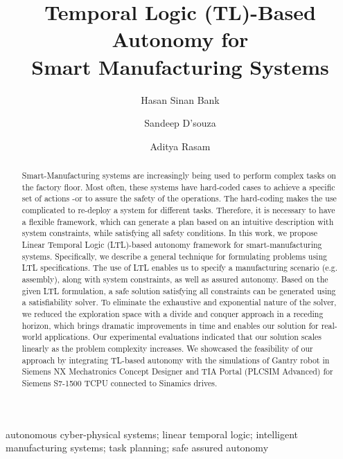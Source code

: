 \documentclass[3p,twocolumn,times,procedia]{elsarticle}
\begin{document}
\begin{frontmatter}


\title{Temporal Logic (TL)-Based Autonomy for\\ Smart Manufacturing Systems}

\author[a]{Hasan Sinan Bank}
\author[b]{Sandeep D'souza}
\author[c]{Aditya Rasam}

\address[a]{Siemens Corporation, Corporate Technology, Princeton, USA} %
\address[b]{Carnegie Mellon University, Pittsburgh, USA}%
\address[c]{North Carolina State University, Raleigh, USA} %

\begin{abstract}
Smart-Manufacturing systems are increasingly being used to perform complex tasks on the factory floor. Most often, these systems have hard-coded cases to achieve a specific set of actions -or to assure the safety of the operations. The hard-coding makes the use complicated to re-deploy a system for different tasks. Therefore, it is necessary to have a flexible framework, which can generate a plan based on an intuitive description with system constraints, while satisfying all safety conditions. In this work, we propose Linear Temporal Logic (LTL)-based autonomy framework for smart-manufacturing systems. Specifically, we describe a general technique for formulating problems using LTL specifications. The use of LTL enables us to specify a manufacturing scenario (e.g. assembly), along with system constraints, as well as assured autonomy. Based on the given LTL formulation, a safe solution satisfying all constraints can be generated using a satisfiability solver. To eliminate the exhaustive and exponential nature of the solver, we reduced the exploration space with a divide and conquer approach in a receding horizon, which brings dramatic improvements in time and enables our solution for real-world applications. Our experimental evaluations indicated that our solution scales linearly as the problem complexity increases. We showcased the feasibility of our approach by integrating TL-based autonomy with the simulations of Gantry robot in Siemens NX Mechatronics Concept Designer and TIA Portal (PLCSIM Advanced) for Siemens S7-1500 TCPU connected to Sinamics drives. 
\end{abstract}

\begin{keyword}
autonomous cyber-physical systems; linear temporal logic; intelligent manufacturing systems; task planning; safe assured autonomy

\end{keyword}
\end{frontmatter}
\end{document}
